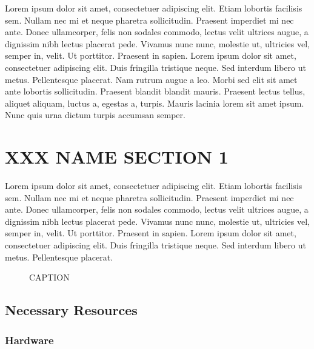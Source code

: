 Lorem ipsum dolor sit amet, consectetuer adipiscing elit. Etiam lobortis facilisis sem. Nullam nec mi et neque pharetra sollicitudin. Praesent imperdiet mi nec ante. Donec ullamcorper, felis non sodales commodo, lectus velit ultrices augue, a dignissim nibh lectus placerat pede. Vivamus nunc nunc, molestie ut, ultricies vel, semper in, velit. Ut porttitor. Praesent in sapien. Lorem ipsum dolor sit amet, consectetuer adipiscing elit. Duis fringilla tristique neque. Sed interdum libero ut metus. Pellentesque placerat. Nam rutrum augue a leo. Morbi sed elit sit amet ante lobortis sollicitudin. Praesent blandit blandit mauris. Praesent lectus tellus, aliquet aliquam, luctus a, egestas a, turpis. Mauris lacinia lorem sit amet ipsum. Nunc quis urna dictum turpis accumsan semper.


\section{XXX NAME SECTION 1}\label{section1}

Lorem ipsum dolor sit amet, consectetuer adipiscing elit. Etiam lobortis facilisis sem. Nullam nec mi et neque pharetra sollicitudin. Praesent imperdiet mi nec ante. Donec ullamcorper, felis non sodales commodo, lectus velit ultrices augue, a dignissim nibh lectus placerat pede. Vivamus nunc nunc, molestie ut, ultricies vel, semper in, velit. Ut porttitor. Praesent in sapien. Lorem ipsum dolor sit amet, consectetuer adipiscing elit. Duis fringilla tristique neque. Sed interdum libero ut metus. Pellentesque placerat. 


\begin{figure}[h!]
\centering
\caption{\small 
	CAPTION
}
\label{fig:fig1}
\end{figure}

\subsection*{Necessary Resources}

\subsubsection*{Hardware}

